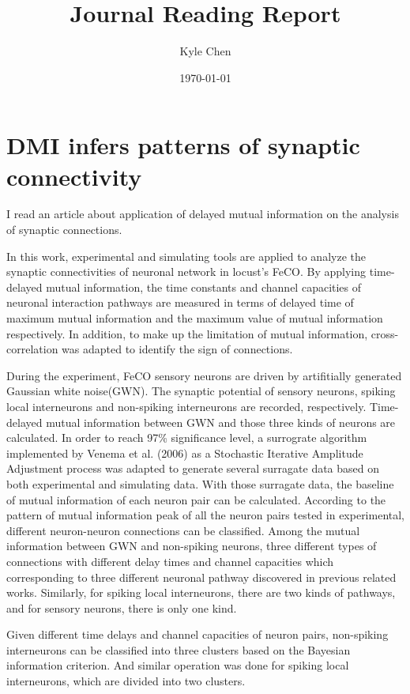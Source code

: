 \documentclass{article}[12pt]
\begin{document}
\title{Journal Reading Report}
\author{Kyle Chen}
\date{\today}

\maketitle

\section*{DMI infers patterns of synaptic connectivity\cite{endo2015delayed}}
I read an article about application of delayed mutual information on the analysis of synaptic connections.

In this work, experimental and simulating tools are applied to analyze the synaptic connectivities of neuronal network in locust's FeCO. By applying time-delayed mutual information, the time constants and channel capacities of neuronal interaction pathways are measured in terms of delayed time of maximum mutual information and the maximum value of mutual information respectively. In addition, to make up the limitation of mutual information, cross-correlation was adapted to identify the sign of connections.

During the experiment, FeCO sensory neurons are driven by artifitially generated Gaussian white noise(GWN). The synaptic potential of sensory neurons, spiking local interneurons and non-spiking interneurons are recorded, respectively. Time-delayed mutual information between GWN and those three kinds of neurons are calculated. In order to reach 97\% significance level, a surrograte algorithm implemented by Venema et al. (2006) \cite{Venema2006} as a Stochastic Iterative Amplitude Adjustment process was adapted to generate several surragate data based on both experimental and simulating data. With those surragate data, the baseline of mutual information of each neuron pair can be calculated. According to the pattern of mutual information peak of all the neuron pairs tested in experimental, different neuron-neuron connections can be classified. Among the mutual information between GWN and non-spiking neurons, three different types of connections with different delay times and channel capacities which corresponding to three different neuronal pathway discovered in previous related works. Similarly, for spiking local interneurons, there are two kinds of pathways, and for sensory neurons, there is only one kind.

Given different time delays and channel capacities of neuron pairs, non-spiking interneurons can be classified into three clusters based on the Bayesian information criterion. And similar operation was done for spiking local interneurons, which are divided into two clusters.
\end{document}
